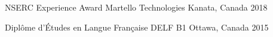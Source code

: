 
\begin{cvhonors}

  \cvhonor
    {NSERC Experience Award} %
    {Martello Technologies} %
    {Kanata, Canada} %
    {2018} %

  \cvhonor
    {Diplôme d’Études en Langue Française} %
    {DELF B1} %
    {Ottawa, Canada} %
    {2015} %


\end{cvhonors}

